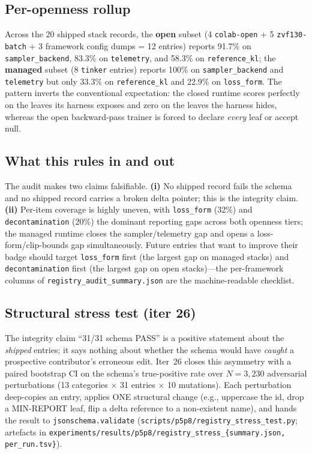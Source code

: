 \documentclass{article}
\begin{document}
\subsection{Per-openness rollup}
Across the 20 shipped stack records, the \textbf{open} subset (4
\texttt{colab-open} + 5 \texttt{zvf130-batch} + 3 framework config
dumps = 12 entries) reports 91.7\% on \texttt{sampler\_backend}, 83.3\%
on \texttt{telemetry}, and 58.3\% on \texttt{reference\_kl}; the
\textbf{managed} subset (8 \texttt{tinker} entries) reports 100\% on
\texttt{sampler\_backend} and \texttt{telemetry} but only 33.3\% on
\texttt{reference\_kl} and 22.9\% on \texttt{loss\_form}. The pattern
inverts the conventional expectation: the closed runtime scores
perfectly on the leaves its harness exposes and zero on the leaves the
harness hides, whereas the open backward-pass trainer is forced to
declare \emph{every} leaf or accept null.

\subsection{What this rules in and out}
The audit makes two claims falsifiable. \textbf{(i)} No shipped record
fails the schema and no shipped record carries a broken delta pointer;
this is the integrity claim. \textbf{(ii)} Per-item coverage is highly
uneven, with \texttt{loss\_form} (32\%) and \texttt{decontamination}
(20\%) the dominant reporting gaps across both openness tiers; the
managed runtime closes the sampler/telemetry gap and opens a
loss-form/clip-bounds gap simultaneously. Future entries that want to
improve their badge should target \texttt{loss\_form} first
(the largest gap on managed stacks) and \texttt{decontamination} first
(the largest gap on open stacks)---the per-framework columns of
\texttt{registry\_audit\_summary.json} are the machine-readable
checklist.

\subsection{Structural stress test (iter 26)}
\label{sec:p6-stress}

The integrity claim ``31/31 schema PASS'' is a positive statement
about the \emph{shipped} entries; it says nothing about whether the
schema would have \emph{caught} a prospective contributor's erroneous
edit. Iter~26 closes this asymmetry with a paired bootstrap CI on the
schema's true-positive rate over $N = 3{,}230$ adversarial
perturbations (13 categories $\times$ 31 entries $\times$ 10
mutations). Each perturbation deep-copies an entry, applies ONE
structural change (e.g., uppercase the id, drop a MIN-REPORT leaf,
flip a delta reference to a non-existent name), and hands the result to
\texttt{jsonschema.validate} (\texttt{scripts/p5p8/registry\_stress\_test.py};
artefacts in
\texttt{experiments/results/p5p8/registry\_stress\_\{summary.json, per\_run.tsv\}}).
\end{document}
